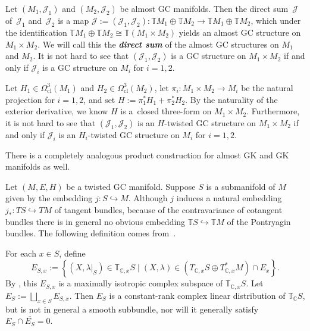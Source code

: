 \documentclass[pdftex]{sigma}
\numberwithin{equation}{section}
\newcommand{\deff}[1]{\textbf{\emph{#1}}}
\newcommand{\func}[3]{#1 \colon #2 \to #3}
\newcommand{\hookfunc}[3]{#1 \colon #2 \hookrightarrow #3}
\newcommand{\pont}[1]{\mathbb{T} {#1}}
\newcommand{\cpont}[1]{\mathbb{T}_{\mathbb{C}} {#1}}
\newcommand{\tang}{T}
\begin{document}
\begin{Example} \label{example2}
Let $(M_1,\mathcal{J}_1)$ and $(M_2,\mathcal{J}_2)$ be almost GC manifolds.  Then the direct sum~$\mathcal{J}$ of~$\mathcal{J}_1$ and~$\mathcal{J}_2$ is a map
  $
    \func{\mathcal{J}:=(\mathcal{J}_1, \mathcal{J}_2)}{
    \pont{M_1} \oplus \pont{M_2}
    }{
    \pont{M_1} \oplus \pont{M_2}
    }
  $,
which under the identif\/ication
  $
    \pont{M_1} \oplus \pont{M_2}
    \cong
    \pont{(M_1 \times M_2)}
  $
yields an almost GC structure on $M_1 \times M_2$.  We will call this the \deff{direct sum} of the almost GC structures on $M_1$ and $M_2$.  It is not hard to see that $(\mathcal{J}_1,\mathcal{J}_2)$ is a GC structure on $M_1 \times M_2$ if and only if $\mathcal{J}_i$ is a GC structure on $M_i$ for $i=1,2$.

Let $H_1 \in \Omega_{\text{cl}}^3(M_1)$ and $H_2 \in \Omega_{\text{cl}}^3(M_2)$, let $\func{\pi_i}{M_1 \times M_2}{M_i}$ be the natural projection for $i=1,2$, and set
$
  H := \pi_1^* H_1 + \pi_2^* H_2
$.
By the naturality of the exterior derivative, we know $H$ is a~closed three-form on $M_1 \times M_2$.  Furthermore, it is not hard to see that $(\mathcal{J}_1,\mathcal{J}_2)$ is an $H$-twisted GC structure on $M_1 \times M_2$ if and only if $\mathcal{J}_i$ is an $H_i$-twisted GC structure on $M_i$ for $i=1,2$.


There is a completely analogous product construction for almost GK and GK  manifolds as well.
\end{Example}


Let $(M,E,H)$ be a twisted GC manifold.  Suppose $S$ is a submanifold of $M$ given by the embedding $\hookfunc{j}{S}{M}$. Although $j$ induces a natural embedding $\hookfunc{j_*}{\tang S}{\tang M}$ of tangent bundles, because of the contravariance of cotangent bundles there is in general no obvious embedding $\pont{S} \hookrightarrow \pont{M}$ of the Pontryagin bundles.  The following def\/inition comes from~\cite{benbassat}.

For each $x \in S$, def\/ine
  \[
    E_{S,x}
    :=
    \left\{ \left( X, \lambda|_{S} \right) \in
    \mathbb{T}_{\mathbb{C},x} S
    \mid (X, \lambda) \in (\tang_{\mathbb{C},x} S \oplus \tang_{\mathbb{C},x}^* M ) \cap E_x \right\}.
  \]
By \cite[Lemma 8.2]{benbassat}, this $E_{S,x}$ is a maximally isotropic complex subspace of $\mathbb{T}_{\mathbb{C}, x} S$.
Let $E_S := \bigsqcup_{x \in S} E_{S, x}$.  Then $E_S$ is a constant-rank complex linear distribution of $\cpont{S}$, but is not in general a smooth subbundle, nor will it generally satisfy $E_S \cap \overline{E_S} = 0$.
\end{document}
